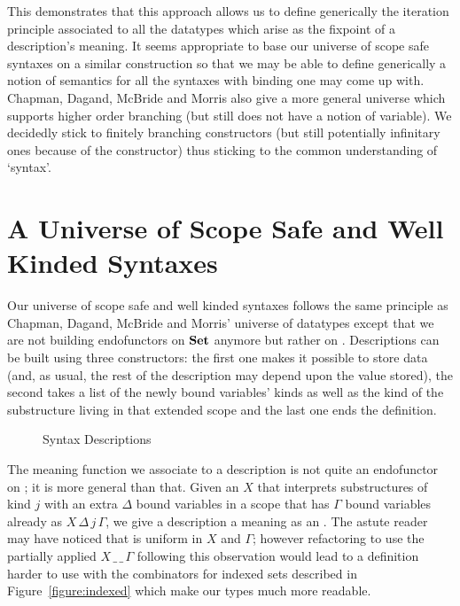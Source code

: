 This demonstrates that this approach allows us to define generically
the iteration principle associated to all the datatypes which arise
as the fixpoint of a description's meaning. It seems appropriate to
base our universe of scope safe syntaxes on a similar construction
so that we may be able to define generically a notion of semantics
for all the syntaxes with binding one may come up with. Chapman,
Dagand, McBride and Morris also give a more general universe which
supports higher order branching (but still does not have a notion
of variable). We decidedly stick to finitely branching constructors
(but still potentially infinitary ones because of the 
constructor) thus sticking to the common understanding of `syntax'.




\section{A Universe of Scope Safe and Well Kinded Syntaxes}

Our universe of scope safe and well kinded syntaxes follows the same principle
as Chapman, Dagand, McBride and Morris' universe of datatypes except that we
are not building endofunctors on $\mathbf{Set}{}$ anymore but rather
on  . Descriptions can be built using three constructors:
the first one makes it possible to store data (and, as usual, the rest of
the description may depend upon the value stored), the second takes a list
of the newly bound variables' kinds as well as the kind of the substructure
living in that extended scope and the last one ends the definition.

\begin{figure}[h]
\caption{Syntax Descriptions}
\end{figure}

The meaning function  we associate to a description is not
quite an endofunctor on  ; it is more general than that.
Given an $X$ that interprets substructures of kind $j$ with an extra $Δ$ bound
variables in a scope that has $Γ$ bound variables already as $X\,Δ\,j\,Γ$,
we give a description a meaning as an  . The astute reader
may have noticed that  is uniform in $X$ and $Γ$; however
refactoring  to use the partially applied $X\,\_\,\_\,Γ$ following
this observation would lead to a definition harder to use with the
combinators for indexed sets described in Figure~\ref{figure:indexed}
which make our types much more readable.

